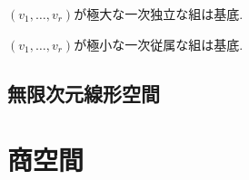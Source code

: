 \begin{prop}
  $(v_1,\ldots, v_r)$が極大な一次独立な組は基底.
\end{prop}
\begin{prop}
  $(v_1,\ldots, v_r)$が極小な一次従属な組は基底.
\end{prop}


\section{無限次元線形空間}
\begin{quiz}
\end{quiz}

\chapter{商空間}
